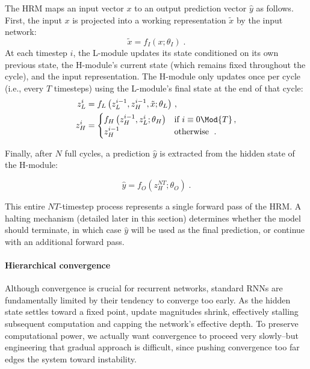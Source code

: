 The HRM maps an input vector $x$ to an output prediction vector $\hat{y}$ as follows. First, the input $x$ is projected into a working representation $\tilde{x}$ by the input network:
\begin{equation*}
    \tilde{x} = f_I(x; \theta_I) \;.
\end{equation*}
At each timestep $i$, the L-module updates its state conditioned on its own previous state, the H-module’s current state (which remains fixed throughout the cycle), and the input representation. The H-module only updates once per cycle (i.e., every $T$ timesteps) using the L-module’s final state at the end of that cycle:
\begin{align*}
    z_L^i &= f_L\left( z_L^{i-1}, z_H^{i-1}, \tilde{x}; \theta_L \right)\,, \\
    z_H^i &= \begin{cases}
f_H\left( z_H^{i-1}, z_L^{i}; \theta_H \right) & \text{if } i \equiv 0\Mod{T}\,, \\
z_H^{i-1} & \text{otherwise }\;.
\end{cases}
\end{align*}

Finally, after $N$ full cycles, a prediction $\hat{y}$ is extracted from the hidden state of the H-module:

\begin{equation*}
    \hat{y} = f_O(z_H^{N T}; \theta_O) \;.
\end{equation*}

This entire $NT$-timestep process represents a single forward pass of the HRM. A halting mechanism (detailed later in this section) determines whether the model should terminate, in which case $\hat{y}$ will be used as the final prediction, or continue with an additional forward pass. 

\paragraph{Hierarchical convergence}


Although convergence is crucial for recurrent networks, standard RNNs are fundamentally limited by their tendency to converge too early. As the hidden state settles toward a fixed point, update magnitudes shrink, effectively stalling subsequent computation and capping the network’s effective depth. To preserve computational power, we actually want convergence to proceed very slowly--but engineering that gradual approach is difficult, since pushing convergence too far edges the system toward instability.


